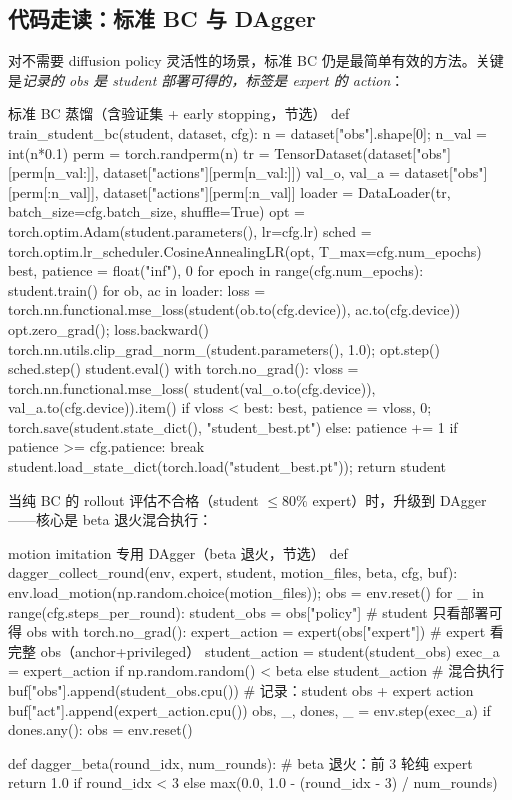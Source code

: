 \subsection{代码走读：标准 BC 与 DAgger}
\label{sec:rlmc-imit-bc-code}

对不需要 diffusion policy 灵活性的场景，标准 BC 仍是最简单有效的方法。关键是\emph{记录的 obs 是 student 部署可得的，标签是 expert 的 action}：

\begin{codebox}[Python]{标准 BC 蒸馏（含验证集 + early stopping，节选）}
def train_student_bc(student, dataset, cfg):
    n = dataset["obs"].shape[0]; n_val = int(n*0.1)
    perm = torch.randperm(n)
    tr = TensorDataset(dataset["obs"][perm[n_val:]], dataset["actions"][perm[n_val:]])
    val_o, val_a = dataset["obs"][perm[:n_val]], dataset["actions"][perm[:n_val]]
    loader = DataLoader(tr, batch_size=cfg.batch_size, shuffle=True)
    opt = torch.optim.Adam(student.parameters(), lr=cfg.lr)
    sched = torch.optim.lr_scheduler.CosineAnnealingLR(opt, T_max=cfg.num_epochs)
    best, patience = float("inf"), 0
    for epoch in range(cfg.num_epochs):
        student.train()
        for ob, ac in loader:
            loss = torch.nn.functional.mse_loss(student(ob.to(cfg.device)),
                                                ac.to(cfg.device))
            opt.zero_grad(); loss.backward()
            torch.nn.utils.clip_grad_norm_(student.parameters(), 1.0); opt.step()
        sched.step()
        student.eval()
        with torch.no_grad():
            vloss = torch.nn.functional.mse_loss(
                student(val_o.to(cfg.device)), val_a.to(cfg.device)).item()
        if vloss < best:
            best, patience = vloss, 0; torch.save(student.state_dict(), "student_best.pt")
        else:
            patience += 1
        if patience >= cfg.patience:
            break
    student.load_state_dict(torch.load("student_best.pt")); return student
\end{codebox}

当纯 BC 的 rollout 评估不合格（student $\le 80\%$ expert）时，升级到 DAgger——核心是 beta 退火混合执行：

\begin{codebox}[Python]{motion imitation 专用 DAgger（beta 退火，节选）}
def dagger_collect_round(env, expert, student, motion_files, beta, cfg, buf):
    env.load_motion(np.random.choice(motion_files)); obs = env.reset()
    for _ in range(cfg.steps_per_round):
        student_obs = obs["policy"]                 # student 只看部署可得 obs
        with torch.no_grad():
            expert_action = expert(obs["expert"])   # expert 看完整 obs（anchor+privileged）
            student_action = student(student_obs)
        exec_a = expert_action if np.random.random() < beta else student_action  # 混合执行
        buf["obs"].append(student_obs.cpu())        # 记录：student obs + expert action
        buf["act"].append(expert_action.cpu())
        obs, _, dones, _ = env.step(exec_a)
        if dones.any(): obs = env.reset()

def dagger_beta(round_idx, num_rounds):             # beta 退火：前 3 轮纯 expert
    return 1.0 if round_idx < 3 else max(0.0, 1.0 - (round_idx - 3) / num_rounds)
\end{codebox}

